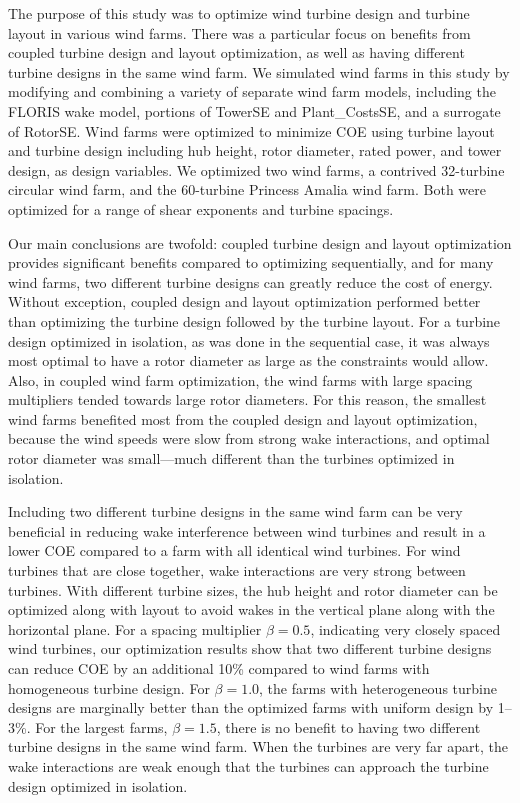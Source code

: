 \documentclass[wes, manuscript]{copernicus}
\begin{document}
\conclusions  %
The purpose of this study was to optimize wind turbine design and turbine layout in various wind farms. There was a particular focus on benefits from coupled turbine design and layout optimization, as well as having different turbine designs in the same wind farm. We simulated wind farms in this study by modifying and combining a variety of separate wind farm models, including the FLORIS wake model, portions of TowerSE and Plant\_CostsSE, and a surrogate of RotorSE. Wind farms were optimized to minimize COE using turbine layout and turbine design including hub height, rotor diameter, rated power, and tower design, as design variables. We optimized two wind farms, a contrived 32-turbine circular wind farm, and the 60-turbine Princess Amalia wind farm. Both were optimized for a range of shear exponents and turbine spacings. 

Our main conclusions are twofold: coupled turbine design and layout optimization provides significant benefits compared to optimizing sequentially, and for many wind farms, two different turbine designs can greatly reduce the cost of energy. Without exception, coupled design and layout optimization performed better than optimizing the turbine design followed by the turbine layout. For a turbine design optimized in isolation, as was done in the sequential case, it was always most optimal to have a rotor diameter as large as the constraints would allow. Also, in coupled wind farm optimization, the wind farms with large spacing multipliers tended towards large rotor diameters. For this reason, the smallest wind farms benefited most from the coupled design and layout optimization, because the wind speeds were slow from strong wake interactions, and optimal rotor diameter was small---much different than the turbines optimized in isolation.

Including two different turbine designs in the same wind farm can be very beneficial in reducing wake interference between wind turbines and result in a lower COE compared to a farm with all identical wind turbines. For wind turbines that are close together, wake interactions are very strong between turbines. With different turbine sizes, the hub height and rotor diameter can be optimized along with layout to avoid wakes in the vertical plane along with the horizontal plane. For a spacing multiplier $\beta=0.5$, indicating very closely spaced wind turbines, our optimization results show that two different turbine designs can reduce COE by an additional 10\% compared to wind farms with homogeneous turbine design. For $\beta=1.0$, the farms with heterogeneous turbine designs are marginally better than the optimized farms with uniform design by 1--3\%. For the largest farms, $\beta=1.5$, there is no benefit to having two different turbine designs in the same wind farm. When the turbines are very far apart, the wake interactions are weak enough that the turbines can approach the turbine design optimized in isolation. 
\end{document}
